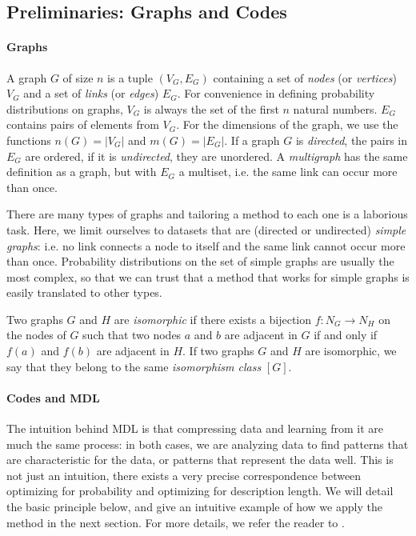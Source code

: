 \documentclass[twoside,11pt]{article}
\begin{document}
\subsection{Preliminaries: Graphs and Codes}
\label{section:preliminaries}

\paragraph{Graphs} A graph $G$ of size $n$ is a tuple $(V_G, E_G)$ containing a set of \emph{nodes} (or \emph{vertices}) $V_G$ and a set of \emph{links} (or \emph{edges}) $E_G$. For convenience in defining probability distributions on graphs, $V_G$ is always the set of the first $n$ natural numbers. $E_G$ contains pairs of elements from $V_G$. For the dimensions of the graph, we use the functions $n(G) = |V_G|$ and $m(G) = |E_G|$. If a graph $G$ is \emph{directed}, the pairs in $E_G$ are ordered, if it is \emph{undirected}, they are unordered. A \emph{multigraph} has the same definition as a graph, but with $E_G$ a multiset, i.e. the same link can occur more than once.

There are many types of graphs and tailoring a method to each one is a laborious task. Here, we limit ourselves to datasets that are (directed or undirected) \emph{simple graphs}: i.e. no link connects a node to itself and the same link cannot occur more than once. Probability distributions on the set of simple graphs are usually the most complex, so that we can trust that a method that works for simple graphs is easily translated to other types.

Two graphs $G$ and $H$ are \emph{isomorphic} if there exists a bijection $f: N_G \to N_H$ on the nodes of $G$ such that two nodes $a$ and $b$ are adjacent in $G$ if and only if $f(a)$ and $f(b)$ are adjacent in $H$. If two graphs $G$ and $H$ are isomorphic, we say that they belong to the same \emph{isomorphism class} $[G]$.

\paragraph{Codes and MDL} The intuition behind MDL is that compressing data and learning from it are much the same process: in both cases, we are analyzing data to find patterns that are characteristic for the data, or patterns that represent the data well. This is not just an intuition, there exists a very precise correspondence between optimizing for probability and optimizing for description length. We will detail the basic principle below, and give an intuitive example of how we apply the method in the next section. For more details, we refer the reader to \cite{grunwald2007minimum}.
 
\end{document}
